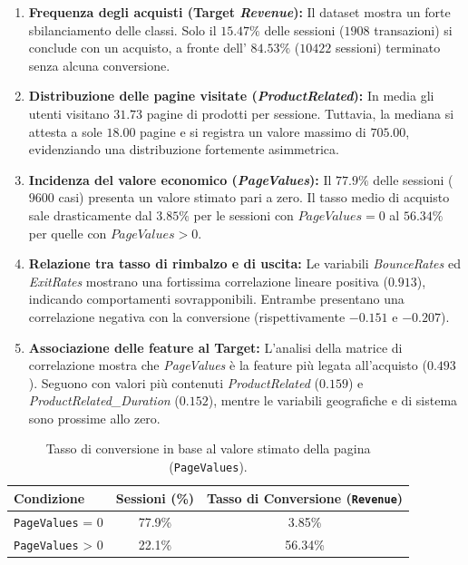\documentclass[11pt,a4paper]{article}
\begin{document}
\begin{enumerate}
    \item \textbf{Frequenza degli acquisti (Target \textit{Revenue}):} Il dataset mostra un forte sbilanciamento delle classi. Solo il $15.47\%$ delle sessioni ($1908$ transazioni) si conclude con un acquisto, a fronte dell' $84.53\%$ ($10422$ sessioni) terminato senza alcuna conversione.
    
    \item \textbf{Distribuzione delle pagine visitate (\textit{ProductRelated}):} In media gli utenti visitano $31.73$ pagine di prodotti per sessione. Tuttavia, la mediana si attesta a sole $18.00$ pagine e si registra un valore massimo di $705.00$, evidenziando una distribuzione fortemente asimmetrica.
    
    \item \textbf{Incidenza del valore economico (\textit{PageValues}):} Il $77.9\%$ delle sessioni ($9600$ casi) presenta un valore stimato pari a zero. Il tasso medio di acquisto sale drasticamente dal $3.85\%$ per le sessioni con $\textit{PageValues} = 0$ al $56.34\%$ per quelle con $\textit{PageValues} > 0$.
    
    \item \textbf{Relazione tra tasso di rimbalzo e di uscita:} Le variabili \textit{BounceRates} ed \textit{ExitRates} mostrano una fortissima correlazione lineare positiva ($0.913$), indicando comportamenti sovrapponibili. Entrambe presentano una correlazione negativa con la conversione (rispettivamente $-0.151$ e $-0.207$).
    
    \item \textbf{Associazione delle feature al Target:} L'analisi della matrice di correlazione mostra che \textit{PageValues} è la feature più legata all'acquisto ($0.493$). Seguono con valori più contenuti \textit{ProductRelated} ($0.159$) e \textit{ProductRelated\_Duration} ($0.152$), mentre le variabili geografiche e di sistema sono prossime allo zero.
\end{enumerate}


\begin{table}[htbp]
\centering
\caption{Tasso di conversione in base al valore stimato della pagina (\texttt{PageValues}).}
\label{tab:page_values}
\begin{tabular}{lcc}
\toprule
\textbf{Condizione} & \textbf{Sessioni (\%)} & \textbf{Tasso di Conversione (\texttt{Revenue})} \\
\midrule
\texttt{PageValues} = 0 & 77.9\% & 3.85\% \\
\texttt{PageValues} > 0 & 22.1\% & 56.34\% \\
\bottomrule
\end{tabular}
\end{table}
\end{document}
